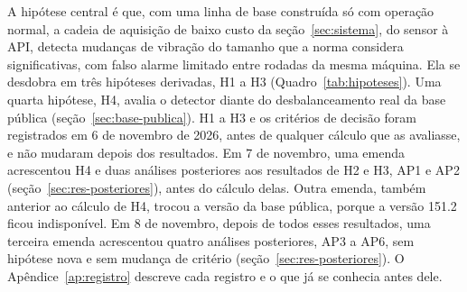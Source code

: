 A hipótese central é que, com uma linha de base construída só com operação normal, a cadeia de aquisição de baixo custo da seção~\ref{sec:sistema}, do sensor à API, detecta mudanças de vibração do tamanho que a norma considera significativas, com falso alarme limitado entre rodadas da mesma máquina. Ela se desdobra em três hipóteses derivadas, H1 a H3 (Quadro~\ref{tab:hipoteses}). Uma quarta hipótese, H4, avalia o detector diante do desbalanceamento real da base pública (seção~\ref{sec:base-publica}). H1 a H3 e os critérios de decisão foram registrados em 6 de novembro de 2026, antes de qualquer cálculo que as avaliasse, e não mudaram depois dos resultados. Em 7 de novembro, uma emenda acrescentou H4 e duas análises posteriores aos resultados de H2 e H3, AP1 e AP2 (seção~\ref{sec:res-posteriores}), antes do cálculo delas. Outra emenda, também anterior ao cálculo de H4, trocou a versão da base pública, porque a versão 151.2 ficou indisponível. Em 8 de novembro, depois de todos esses resultados, uma terceira emenda acrescentou quatro análises posteriores, AP3 a AP6, sem hipótese nova e sem mudança de critério (seção~\ref{sec:res-posteriores}). O Apêndice~\ref{ap:registro} descreve cada registro e o que já se conhecia antes dele.

